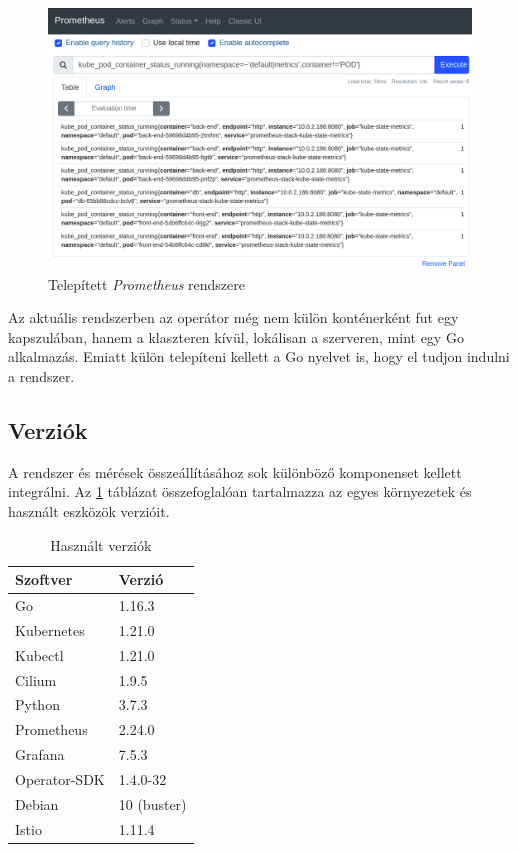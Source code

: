 \begin{figure}[!ht]
\centering
\includegraphics[width=150mm, keepaspectratio]{figures/prometheus_example.png}
\caption{Telepített \textit{Prometheus} rendszere}
\label{fig:prometheus_example}
\end{figure}

Az aktuális rendszerben az operátor még nem külön konténerként fut egy kapszulában, hanem a klaszteren kívül, lokálisan a szerveren, mint egy Go alkalmazás. Emiatt külön telepíteni kellett a Go nyelvet is, hogy el tudjon indulni a rendszer.

\subsection{Verziók}
A rendszer és mérések összeállításához sok különböző komponenset kellett integrálni. Az \ref{tab:versions} táblázat összefoglalóan tartalmazza az egyes környezetek és használt eszközök verzióit. 

\begin{table}[ht]
\centering
  \begin{tabular}{l l}
	  Szoftver 		& Verzió \\
    \hline
      Go 			& 1.16.3 \\ 
      Kubernetes 	& 1.21.0 \\ 
      Kubectl 		& 1.21.0 \\
      Cilium 		& 1.9.5 \\
      Python 		& 3.7.3 \\ 
      Prometheus 	& 2.24.0 \\ 
      Grafana 		& 7.5.3 \\ 
      Operator-SDK 	& 1.4.0-32 \\ 
      Debian 		& 10 (buster)  \\ 
      Istio			& 1.11.4 \\
  \end{tabular}
  
  \caption{Használt verziók}
\label{tab:versions}
\end{table}


